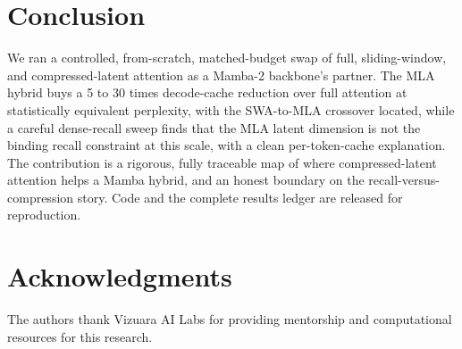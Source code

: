 \documentclass[conference]{IEEEtran}
\begin{document}
\section{Conclusion}
\label{sec:conc}
We ran a controlled, from-scratch, matched-budget swap of full, sliding-window, and compressed-latent attention as a Mamba-2 backbone's partner. The MLA hybrid buys a 5 to 30 times decode-cache reduction over full attention at statistically equivalent perplexity, with the SWA-to-MLA crossover located, while a careful dense-recall sweep finds that the MLA latent dimension is not the binding recall constraint at this scale, with a clean per-token-cache explanation. The contribution is a rigorous, fully traceable map of where compressed-latent attention helps a Mamba hybrid, and an honest boundary on the recall-versus-compression story. Code and the complete results ledger are released for reproduction.

\section*{Acknowledgments}
The authors thank Vizuara AI Labs for providing mentorship and computational resources for this research.
\end{document}
